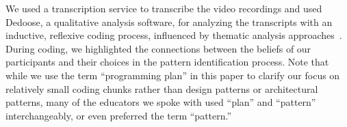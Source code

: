 We used a transcription service to transcribe the video recordings and used Dedoose, a qualitative analysis software, for analyzing the transcripts with an inductive, reflexive coding process, influenced by thematic analysis approaches~\cite{clarke2021thematic}. During coding, we highlighted the connections between the beliefs of our participants and their choices in the pattern identification process. 
Note that while we use the term ``programming plan'' in this paper to clarify our focus on relatively small coding chunks rather than design patterns or architectural patterns, many of the educators we spoke with used ``plan'' and ``pattern'' interchangeably, or even preferred the term ``pattern.''


